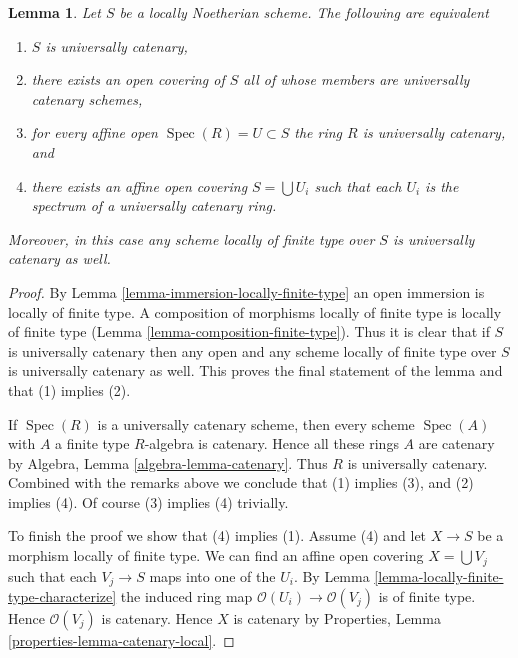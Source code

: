 \documentclass[10pt,a4paper]{amsart}
\theoremstyle{plain}
\newtheorem{lemma}[subsection]{Lemma}
\theoremstyle{definition}
\theoremstyle{remark}
\numberwithin{equation}{subsection}
\def\Spec{\mathop{\mathrm{Spec}}}
\begin{document}
\begin{lemma}
\label{lemma-universally-catenary-local}
Let $S$ be a locally Noetherian scheme. The following are equivalent
\begin{enumerate}
\item $S$ is universally catenary,
\item there exists an open covering of $S$ all of whose members are
universally catenary schemes,
\item for every affine open $\Spec(R) = U \subset S$ the ring
$R$ is universally catenary, and
\item there exists an affine open covering $S = \bigcup U_i$ such
that each $U_i$ is the spectrum of a universally catenary ring.
\end{enumerate}
Moreover, in this case any scheme locally of finite type over $S$
is universally catenary as well.
\end{lemma}

\begin{proof}
By Lemma \ref{lemma-immersion-locally-finite-type} an open immersion
is locally of finite type. A composition of morphisms locally of
finite type is locally of finite type
(Lemma \ref{lemma-composition-finite-type}). Thus it is clear that if $S$ is
universally catenary then any open and any scheme locally of finite
type over $S$ is universally catenary as well. This proves the final
statement of the lemma and that (1) implies (2).

\medskip\noindent
If $\Spec(R)$ is a universally catenary scheme, then every
scheme $\Spec(A)$ with $A$ a finite type $R$-algebra is
catenary. Hence all these rings $A$ are catenary by
Algebra, Lemma \ref{algebra-lemma-catenary}.
Thus $R$ is universally catenary. Combined with the remarks above we
conclude that (1) implies (3), and (2) implies (4). Of course
(3) implies (4) trivially.

\medskip\noindent
To finish the proof we show that (4) implies (1).
Assume (4) and let $X \to S$ be a morphism locally of finite type.
We can find an affine open covering $X = \bigcup V_j$ such that
each $V_j \to S$ maps into one of the $U_i$. By
Lemma \ref{lemma-locally-finite-type-characterize}
the induced ring map $\mathcal{O}(U_i) \to \mathcal{O}(V_j)$ is
of finite type. Hence $\mathcal{O}(V_j)$ is catenary. Hence
$X$ is catenary by Properties, Lemma \ref{properties-lemma-catenary-local}.
\end{proof}
\end{document}

